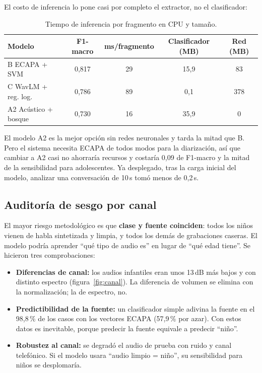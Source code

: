 \documentclass[11pt,a4paper]{article}
\begin{document}
El costo de inferencia lo pone casi por completo el extractor, no el clasificador:

\begin{table}[H]
\centering
\caption{Tiempo de inferencia por fragmento en CPU y tamaño.}
\small
\begin{tabular}{@{}lcccc@{}}
\toprule
\textbf{Modelo} & \textbf{F1-macro} & \textbf{ms/fragmento} & \textbf{Clasificador (MB)} & \textbf{Red (MB)} \\
\midrule
B ECAPA + SVM         & 0,817 & 29 & 15,9 & 83 \\
C WavLM + reg. log.   & 0,786 & 89 & 0,1 & 378 \\
A2 Acústico + bosque  & 0,730 & 16 & 35,9 & 0 \\
\bottomrule
\end{tabular}
\end{table}

El modelo A2 es la mejor opción sin redes neuronales y tarda la mitad que B. Pero el sistema necesita ECAPA de todos modos para la diarización, así que cambiar a A2 casi no ahorraría recursos y costaría 0,09 de F1-macro y la mitad de la sensibilidad para adolescentes. Ya desplegado, tras la carga inicial del modelo, analizar una conversación de 10\,s tomó menos de 0,2\,s.

\subsection{Auditoría de sesgo por canal}
\label{sec:sesgo}

El mayor riesgo metodológico es que \textbf{clase y fuente coinciden}: todos los niños vienen de habla sintetizada y limpia, y todos los demás de grabaciones caseras. El modelo podría aprender ``qué tipo de audio es'' en lugar de ``qué edad tiene''. Se hicieron tres comprobaciones:

\begin{itemize}
  \item \textbf{Diferencias de canal:} los audios infantiles eran unos 13\,dB más bajos y con distinto espectro (figura~\ref{fig:canal}). La diferencia de volumen se elimina con la normalización; la de espectro, no.
  \item \textbf{Predictibilidad de la fuente:} un clasificador simple adivina la fuente en el 98,8\,\% de los casos con los vectores ECAPA (57,9\,\% por azar). Con estos datos es inevitable, porque predecir la fuente equivale a predecir ``niño''.
  \item \textbf{Robustez al canal:} se degradó el audio de prueba con ruido y canal telefónico. Si el modelo usara ``audio limpio = niño'', su sensibilidad para niños se desplomaría.
\end{itemize}
\end{document}
